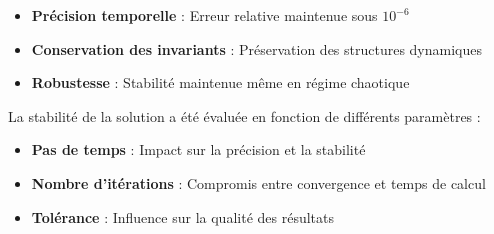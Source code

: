 \begin{itemize}
    \item \textbf{Précision temporelle} : Erreur relative maintenue sous $10^{-6}$
    \item \textbf{Conservation des invariants} : Préservation des structures dynamiques
    \item \textbf{Robustesse} : Stabilité maintenue même en régime chaotique
\end{itemize}

\vskip 0.5cm
La stabilité de la solution a été évaluée en fonction de différents paramètres :

\begin{itemize}
    \item \textbf{Pas de temps} : Impact sur la précision et la stabilité
    \item \textbf{Nombre d'itérations} : Compromis entre convergence et temps de calcul
    \item \textbf{Tolérance} : Influence sur la qualité des résultats
\end{itemize}

            



